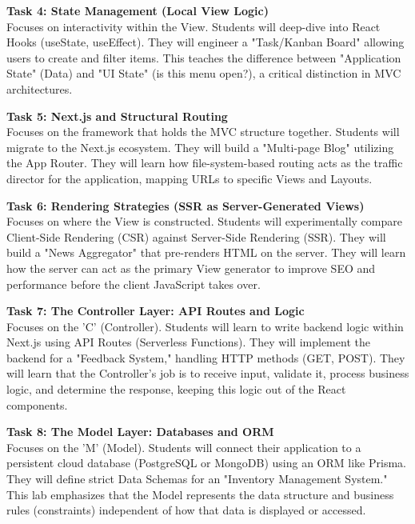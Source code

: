 \vspace{0.3cm}

\noindent\textbf{Task 4: State Management (Local View Logic)} \\
Focuses on interactivity within the View. Students will deep-dive into React Hooks (useState, useEffect). They will engineer a "Task/Kanban Board" allowing users to create and filter items. This teaches the difference between "Application State" (Data) and "UI State" (is this menu open?), a critical distinction in MVC architectures.

\vspace{0.3cm}

\noindent\textbf{Task 5: Next.js and Structural Routing} \\
Focuses on the framework that holds the MVC structure together. Students will migrate to the Next.js ecosystem. They will build a "Multi-page Blog" utilizing the App Router. They will learn how file-system-based routing acts as the traffic director for the application, mapping URLs to specific Views and Layouts.

\vspace{0.3cm}

\noindent\textbf{Task 6: Rendering Strategies (SSR as Server-Generated Views)} \\
Focuses on where the View is constructed. Students will experimentally compare Client-Side Rendering (CSR) against Server-Side Rendering (SSR). They will build a "News Aggregator" that pre-renders HTML on the server. They will learn how the server can act as the primary View generator to improve SEO and performance before the client JavaScript takes over.

\vspace{0.3cm}

\noindent\textbf{Task 7: The Controller Layer: API Routes and Logic} \\
Focuses on the 'C' (Controller). Students will learn to write backend logic within Next.js using API Routes (Serverless Functions). They will implement the backend for a "Feedback System," handling HTTP methods (GET, POST). They will learn that the Controller’s job is to receive input, validate it, process business logic, and determine the response, keeping this logic out of the React components.

\vspace{0.3cm}

\noindent\textbf{Task 8: The Model Layer: Databases and ORM} \\
Focuses on the 'M' (Model). Students will connect their application to a persistent cloud database (PostgreSQL or MongoDB) using an ORM like Prisma. They will define strict Data Schemas for an "Inventory Management System." This lab emphasizes that the Model represents the data structure and business rules (constraints) independent of how that data is displayed or accessed.

